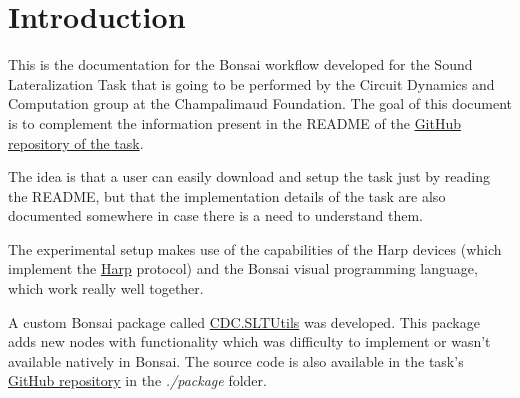 \chapter{Introduction}
\label{chap:introduction}
This is the documentation for the Bonsai workflow developed for the Sound Lateralization Task that is going to be performed by the Circuit Dynamics and Computation group  at the Champalimaud Foundation. The goal of this document is to complement the information present in the README of the \href{https://github.com/fchampalimaud/CDC.SoundLateralizationTask}{GitHub repository of the task}. 

The idea is that a user can easily download and setup the task just by reading the README, but that the implementation details of the task are also documented somewhere in case there is a need to understand them.

The experimental setup makes use of the capabilities of the Harp devices (which implement the \href{https://harp-tech.org/}{Harp} protocol) and the Bonsai visual programming language, which work really well together. 

A custom Bonsai package called \href{https://www.nuget.org/packages/CDC.SLTUtils/}{CDC.SLTUtils} was developed. This package adds new nodes with functionality which was difficulty to implement or wasn't available natively in Bonsai. The source code is also available in the task's \href{https://github.com/fchampalimaud/CDC.SoundLateralizationTask}{GitHub repository} in the \textit{./package} folder.